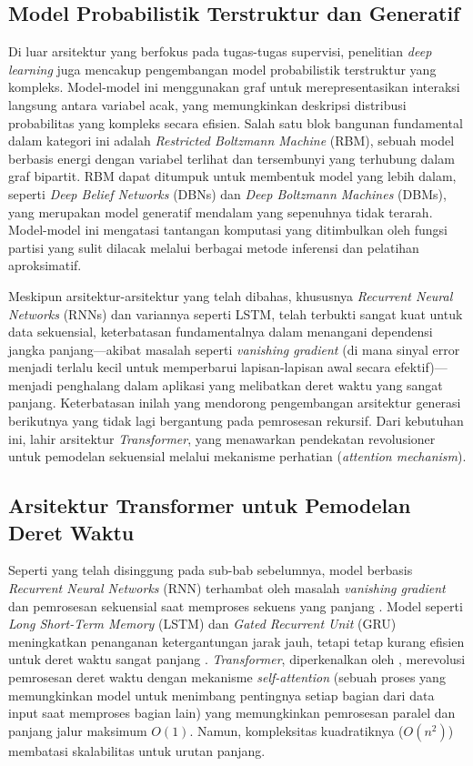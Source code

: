 \subsection{Model Probabilistik Terstruktur dan Generatif}
Di luar arsitektur yang berfokus pada tugas-tugas supervisi, penelitian \textit{deep learning} juga mencakup pengembangan model probabilistik terstruktur yang kompleks. Model-model ini menggunakan graf untuk merepresentasikan interaksi langsung antara variabel acak, yang memungkinkan deskripsi distribusi probabilitas yang kompleks secara efisien. Salah satu blok bangunan fundamental dalam kategori ini adalah \textit{Restricted Boltzmann Machine} (RBM), sebuah model berbasis energi dengan variabel terlihat dan tersembunyi yang terhubung dalam graf bipartit. RBM dapat ditumpuk untuk membentuk model yang lebih dalam, seperti \textit{Deep Belief Networks} (DBNs) dan \textit{Deep Boltzmann Machines} (DBMs), yang merupakan model generatif mendalam yang sepenuhnya tidak terarah. Model-model ini mengatasi tantangan komputasi yang ditimbulkan oleh fungsi partisi yang sulit dilacak melalui berbagai metode inferensi dan pelatihan aproksimatif\parencite{Goodfellow2016}.

Meskipun arsitektur-arsitektur yang telah dibahas, khususnya \textit{Recurrent Neural Networks} (RNNs) dan variannya seperti LSTM, telah terbukti sangat kuat untuk data sekuensial, keterbatasan fundamentalnya dalam menangani dependensi jangka panjang—akibat masalah seperti \textit{vanishing gradient} (di mana sinyal error menjadi terlalu kecil untuk memperbarui lapisan-lapisan awal secara efektif)—menjadi penghalang dalam aplikasi yang melibatkan deret waktu yang sangat panjang. Keterbatasan inilah yang mendorong pengembangan arsitektur generasi berikutnya yang tidak lagi bergantung pada pemrosesan rekursif. Dari kebutuhan ini, lahir arsitektur \textit{Transformer}, yang menawarkan pendekatan revolusioner untuk pemodelan sekuensial melalui mekanisme perhatian (\textit{attention mechanism}).

\subsection{Arsitektur Transformer untuk Pemodelan Deret Waktu}

Seperti yang telah disinggung pada sub-bab sebelumnya, model berbasis \textit{Recurrent Neural Networks} (RNN) \citep{Bengio1994} terhambat oleh masalah \textit{vanishing gradient} dan pemrosesan sekuensial saat memproses sekuens yang panjang \citep{Hochreiter1997}. Model seperti \textit{Long Short-Term Memory} (LSTM) dan \textit{Gated Recurrent Unit} (GRU) meningkatkan penanganan ketergantungan jarak jauh, tetapi tetap kurang efisien untuk deret waktu sangat panjang \citep{Hochreiter1997}. \textit{Transformer}, diperkenalkan oleh \citet{Vaswani2017}, merevolusi pemrosesan deret waktu dengan mekanisme \textit{self-attention} (sebuah proses yang memungkinkan model untuk menimbang pentingnya setiap bagian dari data input saat memproses bagian lain) yang memungkinkan pemrosesan paralel dan panjang jalur maksimum \( O(1) \). Namun, kompleksitas kuadratiknya (\( O(n^2) \)) membatasi skalabilitas untuk urutan panjang.

